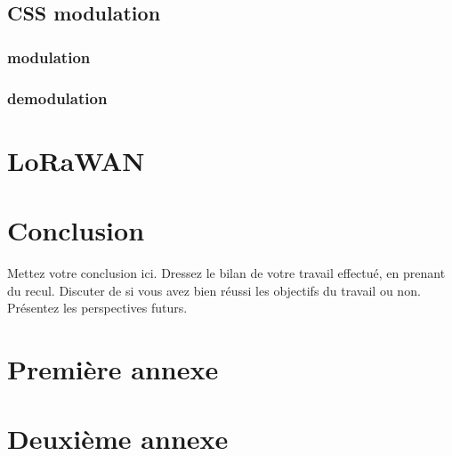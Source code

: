 \documentclass[12pt,a4paper,oneside, titlepage]{report}
\begin{document}
\section{CSS modulation}

\subsection{modulation}

\subsection{demodulation}

\chapter{LoRaWAN}
\renewcommand{\leftmark}{CHAPITRE \thechapter.~~Titre du troisième chapitre}

\chapter*{Conclusion}
\renewcommand{\leftmark}{CONCLUSION}

Mettez votre conclusion ici.  Dressez le bilan de votre travail effectué, en prenant du recul. Discuter de si vous avez bien réussi les objectifs du travail ou non. Présentez les perspectives futurs.






\newpage
\appendix
{}

\chapter{Premi\`ere annexe}
\renewcommand{\leftmark}{ANNEXE \thechapter.~~Premi\`ere annexe}
\label{annexe1}

\chapter{Deuxi\`eme annexe}
\renewcommand{\leftmark}{ANNEXE \thechapter.~~Deuxi\`eme annexe}
\label{annexe2}

\end{document}
